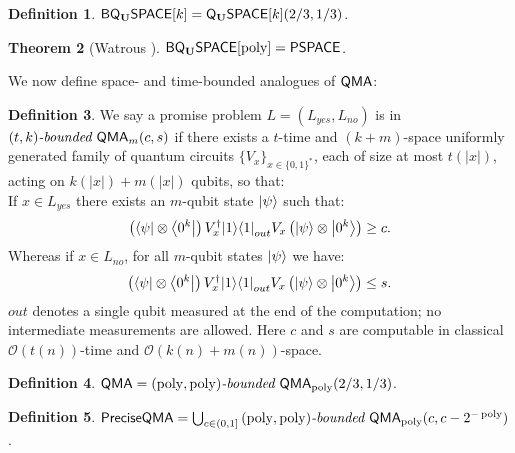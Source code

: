 \documentclass[11pt]{article}
\newtheorem{theorem}{Theorem}
\theoremstyle{definition}
\newtheorem{definition}[theorem]{Definition}
\theoremstyle{remark}
\newcommand\QMA{{\sf{QMA}}}
\newcommand\QSPACE{{\sf{Q_{U}SPACE}}}
\newcommand\PQSPACE{{\sf{PQ_{U}SPACE}}}
\newcommand\PSPACE{{\sf{PSPACE}}}
\newcommand\preciseQMA{{\sf{PreciseQMA}}}
\newcommand\bddQMA[5]{{\left(#1,#2\right)}\textit{-bounded }\QMA_{#3}(#4,#5)}
\newcommand{\classfont}{\sf}
\newcommand{\Unitary}{\mathbf{U}}
\newcommand{\unitaryQSPACE}[3]{{\classfont{Q}_\Unitary\classfont{SPACE}}[#1](#2,#3)}
\newcommand{\unitaryBQSPACE}[1]{{\classfont{BQ}_\Unitary\classfont{SPACE}}[#1]}
\newcommand\bigoh{\mathcal{O}}
\DeclareMathOperator{\poly}{poly}
\begin{document}
\begin{definition} $\unitaryBQSPACE{k}=\unitaryQSPACE{k}{2/3}{1/3}$.\end{definition}
\begin{theorem}[Watrous \cite{Watrous99,Watrous03}]\label{thm:pqpspace} $\unitaryBQSPACE{\poly}=\PSPACE$.
\end{theorem}

We now define space- and time-bounded analogues of $\QMA$:
\begin{definition}We say a promise problem $L=(L_{yes},L_{no})$ is in $\bddQMA{t}{k}{m}{c}{s}$ if there exists a $t$-time and $(k+m)$-space uniformly generated family of quantum circuits $\{ V_x\}_{x\in\{0,1\}^*}$, each of size at most $t(|x|)$, acting on $k(|x|)+m(|x|)$ qubits, so that:\\

If $x \in L_{yes}$ there exists an $m$-qubit state ${\left\vert{\psi}\right\rangle}$ such that:
\begin{equation}
\left({\left\langle{\psi}\right\vert}\otimes {\left\langle{0^k}\right\vert}\right) V^\dagger_x {\left\vert{1}\right\rangle}{\left\langle{1}\right\vert}_{out} V_x \left({\left\vert{\psi}\right\rangle}\otimes {\left\vert{0^k}\right\rangle}\right) \ge c.
\end{equation}
Whereas if $x \in L_{no}$, for all $m$-qubit states ${\left\vert{\psi}\right\rangle}$ we have:
\begin{equation}
\left({\left\langle{\psi}\right\vert}\otimes {\left\langle{0^k}\right\vert}\right) V^\dagger_x {\left\vert{1}\right\rangle}{\left\langle{1}\right\vert}_{out} V_x \left({\left\vert{\psi}\right\rangle}\otimes {\left\vert{0^k}\right\rangle}\right) \le s.
\end{equation}
$out$ denotes a single qubit measured at the end of the computation; no intermediate measurements are allowed.  
Here $c$ and $s$ are computable in classical $\bigoh(t(n))$-time and $\bigoh(k(n)+m(n))$-space.
  \end{definition}

\begin{definition} $\QMA=\bddQMA{\poly}{\poly}{\poly}{2/3}{1/3}$.
\end{definition}
\begin{definition} $\preciseQMA=\bigcup_{c \in (0,1]}\bddQMA{\poly}{\poly}{\poly}{c}{c-2^{-\poly}}$.
\end{definition}
\end{document}
